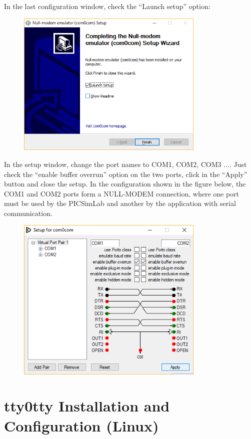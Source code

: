 In the last configuration window, check the ``Launch setup'' option:
\begin{figure}[H]
\center
\includegraphics[width=0.8\textwidth]{img/com0com2.png} 
\end{figure} 

In the setup window, change the port names to COM1, COM2, COM3 ....
Just check the ``enable buffer overrun'' option on the two ports, click in the ``Apply'' button and close the setup.
In the configuration shown in the figure below, the COM1 and COM2 ports form a NULL-MODEM connection, where one port must be used by the PICSimLab and another by the application with serial communication.
\begin{figure}[H]
\center
\includegraphics[width=0.8\textwidth]{img/com0com3.png} 
\end{figure} 
 
\section{tty0tty Installation and Configuration (Linux)}
 
